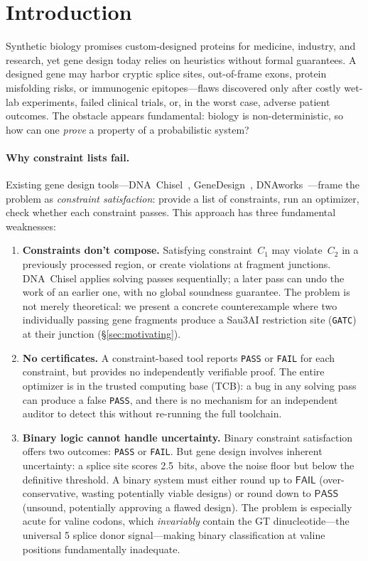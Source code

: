 \documentclass[acmsmall,review,anonymous]{acmart}
\newcommand{\PASS}{\ensuremath{\mathsf{PASS}}\xspace}
\newcommand{\FAIL}{\ensuremath{\mathsf{FAIL}}\xspace}
\begin{document}
\section{Introduction}\label{sec:intro}

Synthetic biology promises custom-designed proteins for medicine,
industry, and research, yet gene design today relies on heuristics
without formal guarantees.
A designed gene may harbor cryptic splice sites, out-of-frame exons,
protein misfolding risks, or immunogenic epitopes---flaws discovered
only after costly wet-lab experiments, failed clinical trials, or, in
the worst case, adverse patient outcomes.
The obstacle appears fundamental: biology is non-deterministic, so how
can one \emph{prove} a property of a probabilistic system?

\paragraph{Why constraint lists fail.}
Existing gene design tools---DNA~Chisel~\cite{piret2020dnachisel},
GeneDesign~\cite{richardson2006genedesign},
DNAworks~\cite{vandenbergh2015dnaworks}---frame the problem as
\emph{constraint satisfaction}: provide a list of constraints, run an
optimizer, check whether each constraint passes.
This approach has three fundamental weaknesses:

\begin{enumerate}[leftmargin=*,itemsep=1pt,topsep=2pt]
\item \textbf{Constraints don't compose.}
Satisfying constraint~$C_1$ may violate~$C_2$ in a previously
processed region, or create violations at fragment junctions.
DNA~Chisel applies solving passes sequentially; a later pass can undo
the work of an earlier one, with no global soundness guarantee.
The problem is not merely theoretical: we present a concrete
counterexample where two individually passing gene fragments produce a
Sau3AI restriction site (\texttt{GATC}) at their junction
(\S\ref{sec:motivating}).

\item \textbf{No certificates.}
A constraint-based tool reports \texttt{PASS} or \texttt{FAIL} for
each constraint, but provides no independently verifiable proof.
The entire optimizer is in the trusted computing base (TCB): a bug in
any solving pass can produce a false \texttt{PASS}, and there is no
mechanism for an independent auditor to detect this without re-running
the full toolchain.

\item \textbf{Binary logic cannot handle uncertainty.}
Binary constraint satisfaction offers two outcomes:
\texttt{PASS} or \texttt{FAIL}.
But gene design involves inherent uncertainty: a splice site scores
2.5~bits, above the noise floor but below the definitive threshold.
A binary system must either round up to \FAIL{} (over-conservative,
wasting potentially viable designs) or round down to \PASS{}
(unsound, potentially approving a flawed design).
The problem is especially acute for valine codons, which
\emph{invariably} contain the GT dinucleotide---the universal
5\textquotesingle{} splice donor signal---making binary classification
at valine positions fundamentally inadequate.
\end{enumerate}
\end{document}
